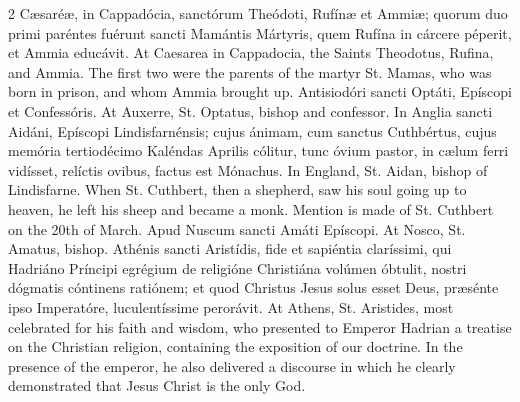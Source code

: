 \begin{paracol}{2}
Cæsaréæ, in Cappadócia, sanctórum Theódoti, Rufínæ et Ammiæ; quorum duo primi paréntes fuérunt 
 sancti Mamántis Mártyris, quem Rufína in cárcere péperit, et Ammia educávit.
\switchcolumn
{}
At Caesarea in Cappadocia, the 
 Saints Theodotus, Rufina, and Ammia. The first two were the parents of 
 the martyr St. Mamas, who was born in prison, and whom Ammia brought up.
\switchcolumn*
{}
Antisiodóri sancti 
 Optáti, Epíscopi et Confessóris.
\switchcolumn
{}
At Auxerre, St. Optatus, bishop and 
 confessor.
\switchcolumn*
{}
In Anglia sancti Aidáni, 
 Epíscopi Lindisfarnénsis; cujus ánimam, cum sanctus Cuthbértus, cujus 
 memória tertiodécimo Kaléndas Aprilis cólitur, tunc óvium pastor, in cælum 
 ferri vidísset, relíctis ovibus, factus est Mónachus.
\switchcolumn
{}
In England, St. Aidan, bishop of 
 Lindisfarne. When St. Cuthbert, then a shepherd, saw his soul going up 
 to heaven, he left his sheep and became a monk. Mention is made of St. 
 Cuthbert on the 20th of March.
\switchcolumn*
{}
Apud Nuscum sancti 
 Amáti Epíscopi.
\switchcolumn
{}
At Nosco, St. Amatus, bishop.
\switchcolumn*
{}
Athénis sancti 
 Aristídis, fide et sapiéntia claríssimi, qui Hadriáno Príncipi egrégium de 
 religióne Christiána volúmen óbtulit, nostri dógmatis cóntinens ratiónem; et 
 quod Christus Jesus solus esset Deus, præsénte ipso Imperatóre, 
 luculentíssime perorávit.
\switchcolumn
{}
At Athens, St. Aristides, most 
 celebrated for his faith and wisdom, who presented to Emperor Hadrian a 
 treatise on the Christian religion, containing the exposition of our 
 doctrine. In the presence of the emperor, he also delivered a 
 discourse in which he clearly demonstrated that Jesus Christ is the only God.
\switchcolumn*
{}
\end{paracol}
